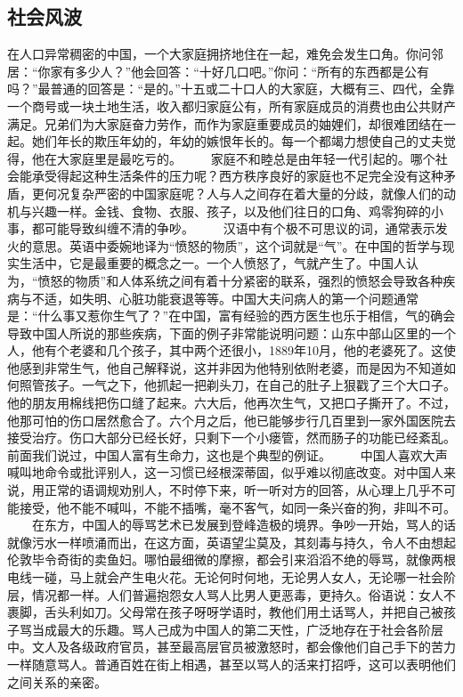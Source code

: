 \documentclass[12pt,oneside]{book}
\begin{document}
\begin{common-format}
\chapter{社会风波}
在人口异常稠密的中国，一个大家庭拥挤地住在一起，难免会发生口角。你问邻居：“你家有多少人？”他会回答：“十好几口吧。”你问：“所有的东西都是公有吗？”最普通的回答是：“是的。”十五或二十口人的大家庭，大概有三、四代，全靠一个商号或一块土地生活，收入都归家庭公有，所有家庭成员的消费也由公共财产满足。兄弟们为大家庭奋力劳作，而作为家庭重要成员的妯娌们，却很难团结在一起。她们年长的欺压年幼的，年幼的嫉恨年长的。每一个都竭力想使自己的丈夫觉得，他在大家庭里是最吃亏的。 
　　家庭不和睦总是由年轻一代引起的。哪个社会能承受得起这种生活条件的压力呢？西方秩序良好的家庭也不足完全没有这种矛盾，更何况复杂严密的中国家庭呢？人与人之间存在着大量的分歧，就像人们的动机与兴趣一样。金钱、食物、衣服、孩子，以及他们往日的口角、鸡零狗碎的小事，都可能导致纠缠不清的争吵。 
　　汉语中有个极不可思议的词，通常表示发火的意思。英语中委婉地译为“愤怒的物质”，这个词就是“气”。在中国的哲学与现实生活中，它是最重要的概念之一。一个人愤怒了，气就产生了。中国人认为，“愤怒的物质”和人体系统之间有着十分紧密的联系，强烈的愤怒会导致各种疾病与不适，如失明、心脏功能衰退等等。中国大夫问病人的第一个问题通常是：“什么事又惹你生气了？”在中国，富有经验的西方医生也乐于相信，气的确会导致中国人所说的那些疾病，下面的例子非常能说明问题：山东中部山区里的一个人，他有个老婆和几个孩子，其中两个还很小，1889年10月，他的老婆死了。这使他感到非常生气，他自己解释说，这并非因为他特别依附老婆，而是因为不知道如何照管孩子。一气之下，他抓起一把剃头刀，在自己的肚子上狠戳了三个大口子。他的朋友用棉线把伤口缝了起来。六大后，他再次生气，又把口子撕开了。不过，他那可怕的伤口居然愈合了。六个月之后，他已能够步行几百里到一家外国医院去接受治疗。伤口大部分已经长好，只剩下一个小瘘管，然而肠子的功能已经紊乱。前面我们说过，中国人富有生命力，这也是个典型的例证。 
　　中国人喜欢大声喊叫地命令或批评别人，这一习惯已经根深蒂固，似乎难以彻底改变。对中国人来说，用正常的语调规劝别人，不时停下来，听一听对方的回答，从心理上几乎不可能接受，他不能不喊叫，不能不插嘴，毫不客气，如同一条兴奋的狗，非叫不可。 
　　在东方，中国人的辱骂艺术已发展到登峰造极的境界。争吵一开始，骂人的话就像污水一样喷涌而出，在这方面，英语望尘莫及，其刻毒与持久，令人不由想起伦敦毕令奇街的卖鱼妇。哪怕最细微的摩擦，都会引来滔滔不绝的辱骂，就像两根电线一碰，马上就会产生电火花。无论何时何地，无论男人女人，无论哪一社会阶层，情况都一样。人们普遍抱怨女人骂人比男人更恶毒，更持久。俗语说：女人不裹脚，舌头利如刀。父母常在孩子呀呀学语时，教他们用土话骂人，并把自己被孩子骂当成最大的乐趣。骂人己成为中国人的第二天性，广泛地存在于社会各阶层中。文人及各级政府官员，甚至最高层官员被激怒时，都会像他们自己手下的苦力一样随意骂人。普通百姓在街上相遇，甚至以骂人的活来打招呼，这可以表明他们之间关系的亲密。 

\end{common-format}
\end{document}
